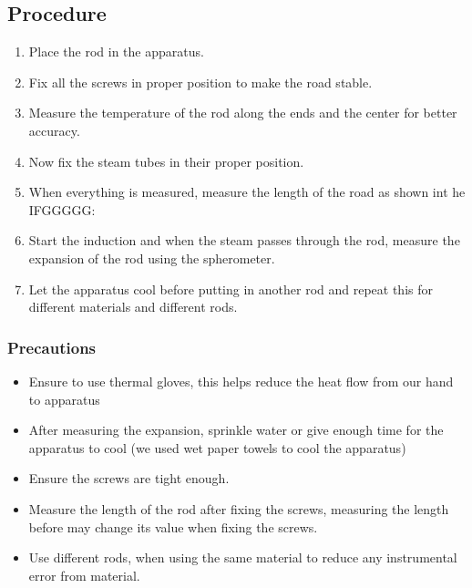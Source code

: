 \documentclass[%
 sor,
 jor,
 amsmath,amssymb,
 reprint,
]{revtex4-2}
\begin{document}
\subsection{Procedure}
\begin{enumerate}
	\item Place the rod in the apparatus.
	\item Fix all the screws in proper position to make the road stable. 
	\item Measure the temperature of the rod along the ends and the center for better accuracy.
	\item Now fix the steam tubes in their proper position.
	\item When everything is measured, measure the length of the road as shown int he IFGGGGG: 
	\item Start the induction and when the steam passes through the rod, measure the expansion of the rod using the spherometer. 
	\item Let the apparatus cool before putting in another rod and repeat this for different materials and different rods.
\end{enumerate}
\subsubsection{Precautions}
\begin{itemize}
	\item Ensure to use thermal gloves, this helps reduce the heat flow from our hand to apparatus
	\item After measuring the expansion, sprinkle water or give enough time for the apparatus to cool (we used wet paper towels to cool the apparatus)
	\item Ensure the screws are tight enough. 
	\item Measure the length of the rod after fixing the screws, measuring the length before may change its value when fixing the screws.
	\item Use different rods, when using the same material to reduce any instrumental error from material.
\end{itemize}
\end{document}
